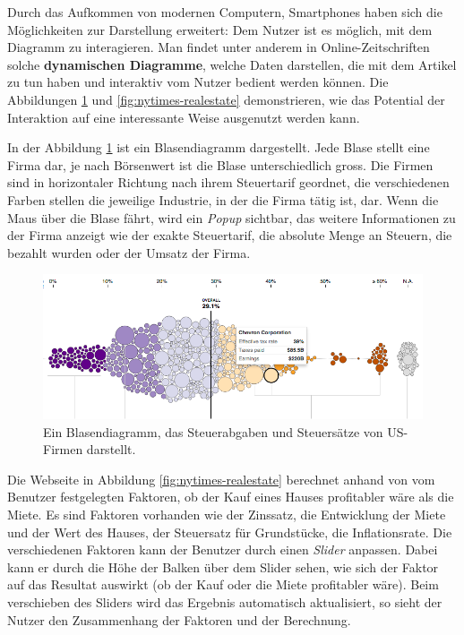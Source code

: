 Durch das Aufkommen von modernen Computern, Smartphones haben sich die Möglichkeiten zur Darstellung erweitert: Dem Nutzer ist es möglich, mit dem Diagramm zu interagieren. Man findet unter anderem in Online-Zeitschriften solche \textbf{dynamischen Diagramme}, welche Daten darstellen, die mit dem Artikel zu tun haben und interaktiv vom Nutzer bedient werden können. Die Abbildungen \ref{fig:nytimes-taxes} und \ref{fig:nytimes-realestate} demonstrieren, wie das Potential der Interaktion auf eine interessante Weise ausgenutzt werden kann.

In der Abbildung \ref{fig:nytimes-taxes} ist ein Blasendiagramm dargestellt. Jede Blase stellt eine Firma dar, je nach Börsenwert ist die Blase unterschiedlich gross. Die Firmen sind in horizontaler Richtung nach ihrem Steuertarif geordnet, die verschiedenen Farben stellen die jeweilige Industrie, in der die Firma tätig ist, dar. Wenn die Maus über die Blase fährt, wird ein \textit{Popup} sichtbar, das weitere Informationen zu der Firma anzeigt wie der exakte Steuertarif, die absolute Menge an Steuern, die bezahlt wurden oder der Umsatz der Firma.

\begin{figure}[!htbp]
	\centering
	\includegraphics[width=\linewidth]{images/nytimes-taxes-zugeschnitten}
	\caption[Blasendiagramm in The New York Times]{Ein Blasendiagramm, das Steuerabgaben und Steuersätze von US-Firmen darstellt. \cite{nytimes-taxes}}
	\label{fig:nytimes-taxes}
\end{figure}

Die Webseite in Abbildung \ref{fig:nytimes-realestate} berechnet anhand von vom Benutzer festgelegten Faktoren, ob der Kauf eines Hauses profitabler wäre als die Miete. Es sind Faktoren vorhanden wie der Zinssatz, die Entwicklung der Miete und der Wert des Hauses, der Steuersatz für Grundstücke, die Inflationsrate. Die verschiedenen Faktoren kann der Benutzer durch einen \textit{Slider} anpassen. Dabei kann er durch die Höhe der Balken über dem Slider sehen, wie sich der Faktor auf das Resultat auswirkt (ob der Kauf oder die Miete profitabler wäre). Beim verschieben des Sliders wird das Ergebnis automatisch aktualisiert, so sieht der Nutzer den Zusammenhang der Faktoren und der Berechnung.

